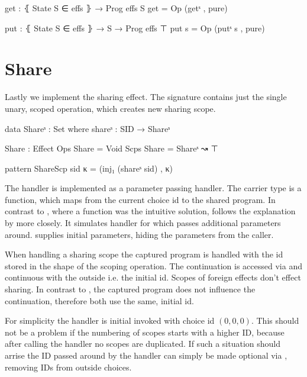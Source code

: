 \begin{code}
get : ⦃ State S ∈ effs ⦄ → Prog effs S
get = Op (getˢ , pure)

put : ⦃ State S ∈ effs ⦄ → S → Prog effs ⊤
put s = Op (putˢ s , pure)
\end{code}


\section{Share}

Lastly we implement the sharing effect.
The signature contains just the single unary, scoped operation, 
which creates new sharing scope.

\begin{code}
data Shareˢ : Set where shareˢ : SID → Shareˢ

Share : Effect
Ops   Share = Void
Scps  Share = Shareˢ ↝ ⊤

pattern ShareScp sid κ = (inj₁ (shareˢ sid) , κ)
\end{code}
The handler is implemented as a parameter passing handler.
The carrier type is a function, which maps from the current choice id to the
shared program.
In contrast to , where a function was the intuitive solution,
 follows the explanation by
\textcite{DBLP:conf/esop/PlotkinP09} more closely.
It simulates handler for  which passes additional parameters
around.
 supplies initial parameters, hiding the parameters from
the caller.

When handling a sharing scope the captured program is handled with the id stored
in the shape of the scoping operation.
The continuation is accessed via \AgdaFunction{>>=} and continuous with the
outside i.e. the initial id.
Scopes of foreign effects don't effect sharing.
In contrast to , the captured program does not influence the
continuation, therefore both use the same, initial id.

For simplicity the handler is initial invoked with choice id $(0,0,0)$.
This should not be a problem if the numbering of scopes starts with a higher ID,
because after calling the  handler no scopes are duplicated.
If such a situation should arrise the ID passed around by the handler can simply
be made optional via , removing IDs from outside choices.

